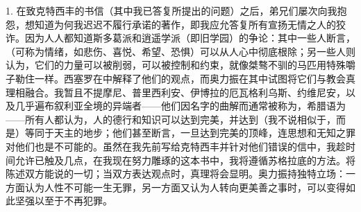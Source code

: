 1. 在致克特西丰的书信（其中我已答复所提出的问题）之后，弟兄们屡次向我抱怨，想知道为何我迟迟不履行承诺的著作，即我应允答复所有宣扬无情之人的狡诈。因为人人都知道斯多葛派和逍遥学派（即旧学园）的争论：其中一些人断言，（可称为情绪，如悲伤、喜悦、希望、恐惧）可以从人心中彻底根除；另一些人则认为，它们的力量可以被削弱，可以被控制和约束，就像桀骜不驯的马匹用特殊嚼子勒住一样。西塞罗在中解释了他们的观点，而奥力振在其中试图将它们与教会真理相融合。我暂且不提摩尼、普里西利安、伊博拉的厄瓦格利乌斯、约维尼安，以及几乎遍布叙利亚全境的异端者——他们因名字的曲解而通常被称为，希腊语为——所有人都认为，人的德行和知识可以达到完美，并达到（我不说相似于，而是）等同于天主的地步；他们甚至断言，一旦达到完美的顶峰，连思想和无知之罪对他们也是不可能的。虽然在我先前写给克特西丰并针对他们错误的信中，我趁时间允许已触及几点，在我现在努力雕琢的这本书中，我将遵循苏格拉底的方法。将陈述双方能说的一切；当双方表达观点时，真理将会显明。奥力振持独特立场：一方面认为人性不可能一生无罪，另一方面又认为人转向更美善之事时，可以变得如此坚强以至于不再犯罪。\newline{}\par

